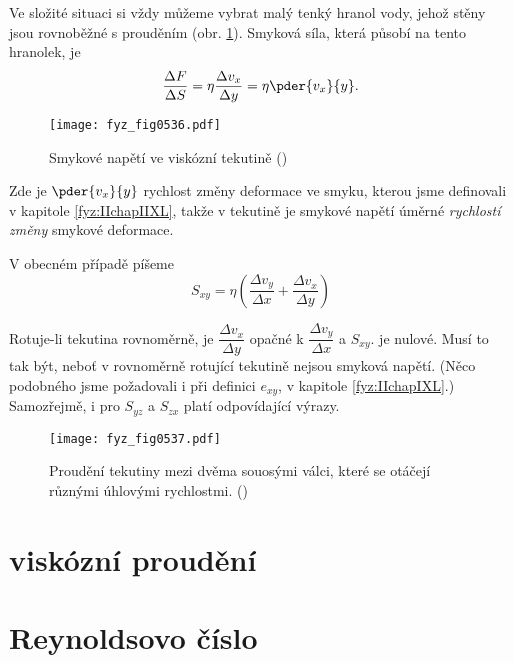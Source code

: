     Ve složité situaci si vždy můžeme vybrat malý tenký hranol vody, jehož stěny jsou rovnoběžné s 
    prouděním (obr. \ref{fyz:fig0536}). Smyková síla, která působí na tento hranolek, je
    \begin{equation}\label{fyz:eq570}
      \dfrac{\Delta F}{\Delta S} = \eta\dfrac{\Delta v_x}{\Delta y} = \eta\pder{v_x}{y}.
    \end{equation}
    \begin{figure}[ht!] %
      \centering
      \texttt{[image: fyz\_fig0536.pdf]}
      \caption{Smykové napětí ve viskózní tekutině
               (\cite[s.~760]{Feynman02})}
      \label{fyz:fig0536}
    \end{figure}
    Zde je \(\pder{v_x}{y}\) rychlost změny deformace ve smyku, kterou jsme definovali v kapitole 
    \ref{fyz:IIchapIIXL}, takže v tekutině je smykové napětí úměrné \emph{rychlostí změny} smykové 
    deformace.

    V obecném případě píšeme
    \begin{equation}\label{fyz:eq571}
      S_{xy} = \eta\left(\dfrac{\Delta v_y}{\Delta x} + \dfrac{\Delta v_x}{\Delta y}\right)
    \end{equation}
    
    Rotuje-li tekutina rovnoměrně, je \(\dfrac{\Delta v_x}{\Delta y}\) opačné k \(\dfrac{\Delta 
    v_y}{\Delta x}\) a \(S_{xy}\). je nulové. Musí to tak být, neboť v rovnoměrně rotující tekutině 
    nejsou smyková napětí. (Něco podobného jsme požadovali i při definici \(e_{xy}\), v kapitole 
    \ref{fyz:IIchapIXL}.) Samozřejmě, i pro \(S_{yz}\) a \(S_{zx}\) platí odpovídající výrazy.
    
    \begin{figure}[ht!] %
      \centering
      \texttt{[image: fyz\_fig0537.pdf]}
      \caption{Proudění tekutiny mezi dvěma souosými válci, které se otáčejí různými úhlovými 
               rychlostmi.
               (\cite[s.~760]{Feynman02})}
      \label{fyz:fig0537}
    \end{figure}
    
  \section{viskózní proudění}\label{fyz:IIchapXLIsecII}
    
  \section{Reynoldsovo číslo}\label{fyz:IIchapXLIsecIII}
  
